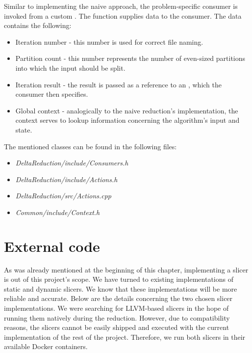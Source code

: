 Similar to implementing the naive approach, the problem-specific consumer is 
invoked from a custom . 
The  function supplies 
data to the consumer. 
The data contains the following:
\begin{itemize}
  \item Iteration number - this number is used for correct file naming.
  \item Partition count - this number represents the number of even-sized 
  partitions into which the input should be split.
  \item Iteration result - the result is passed as a reference to 
  an , which the consumer then specifies.
  \item Global context - analogically to the naive reduction's implementation, 
  the context serves to lookup information concerning the algorithm's input 
  and state.
\end{itemize}
The mentioned classes can be found in the following files: 
\begin{itemize}
  \item \emph{DeltaReduction/include/Consumers.h} 
  \item \emph{DeltaReduction/include/Actions.h} 
  \item \emph{DeltaReduction/src/Actions.cpp}
  \item \emph{Common/include/Context.h}
\end{itemize}

\section{External code}

As was already mentioned at the beginning of this chapter, implementing 
a slicer is out of this project's scope. 
We have turned to existing implementations of static and dynamic slicers. 
We know that these implementations will be more reliable and accurate. 
Below are the details concerning the two chosen slicer implementations. 
We were searching for LLVM-based slicers in the hope of running them natively 
during the reduction. 
However, due to compatibility reasons, the slicers cannot be easily shipped 
and executed with the current implementation of the rest of the project. 
Therefore, we run both slicers in their available Docker containers.


